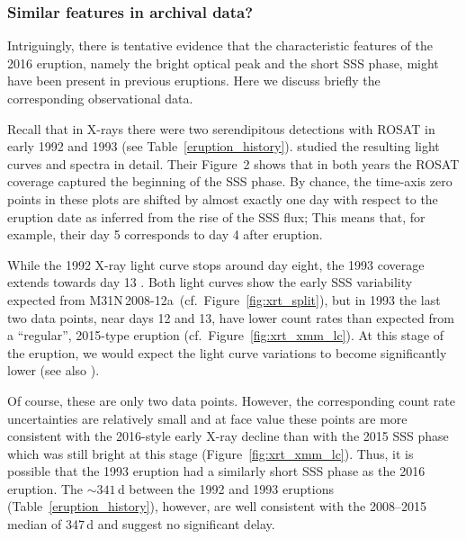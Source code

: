 \documentclass[twocolumn,tighten]{aastex6}
\def\nova{{M31N\,2008-12a~}}
\newcommand{\othreek}{\citetalias{2016ApJ...833..149D}}
\begin{document}
\subsubsection{Similar features in archival data?}\label{similar}

\label{sec:disc_arch}
Intriguingly, there is tentative evidence that the characteristic features of the 2016 eruption, namely the bright optical peak and the short SSS phase, might have been present in previous eruptions. Here we discuss briefly the corresponding observational data.

Recall that in X-rays there were two serendipitous detections with ROSAT \citep{1982AdSpR...2..241T} in early 1992 and 1993 (see Table~\ref{eruption_history}). \citet{1995ApJ...445L.125W} studied the resulting light curves and spectra in detail. Their Figure~2 shows that in both years the ROSAT coverage captured the beginning of the SSS phase. By chance, the time-axis zero points in these plots are shifted by almost exactly one day with respect to the eruption date as inferred from the rise of the SSS flux; This means that, for example, their day 5 corresponds to day 4 after eruption.

While the 1992 X-ray light curve stops around day eight, the 1993 coverage extends towards day 13 \citep{1995ApJ...445L.125W}. Both light curves show the early SSS variability expected from \nova (cf.\ Figure~\ref{fig:xrt_split}), but in 1993 the last two data points, near days 12 and 13, have lower count rates than expected from a ``regular'', 2015-type eruption (cf.\ Figure~\ref{fig:xrt_xmm_lc}). At this stage of the eruption, we would expect the light curve variations to become significantly lower (see also \othreek).

Of course, these are only two data points. However, the corresponding count rate uncertainties are relatively small and at face value these points are more consistent with the 2016-style early X-ray decline than with the 2015 SSS phase which was still bright at this stage (Figure~\ref{fig:xrt_xmm_lc}). Thus, it is possible that the 1993 eruption had a similarly short SSS phase as the 2016 eruption. The $\sim341$\,d between the 1992 and 1993 eruptions (Table~\ref{eruption_history}), however, are well consistent with the 2008--2015 median of 347\,d and suggest no significant delay.
\end{document}
